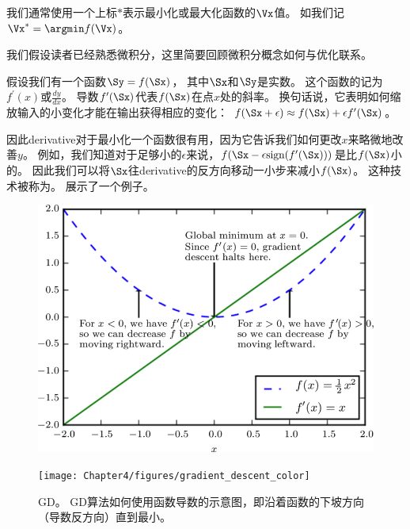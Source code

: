 我们通常使用一个上标$*$表示最小化或最大化函数的$\Vx$值。
如我们记$\Vx^*=\argmin f(\Vx)$。

我们假设读者已经熟悉微积分，这里简要回顾微积分概念如何与优化联系。


假设我们有一个函数$\Sy = f(\Sx)$， 其中$\Sx$和$\Sy$是实数。
这个函数的记为$f^\prime(x)$或$\frac{dy}{dx}$。
导数$f^\prime(\Sx)$代表$f(\Sx)$在点$x$处的斜率。
换句话说，它表明如何缩放输入的小变化才能在输出获得相应的变化：
$f(\Sx+\epsilon) \approx f(\Sx) + \epsilon f^\prime(\Sx) $。

因此\gls{derivative}对于最小化一个函数很有用，因为它告诉我们如何更改$x$来略微地改善$y$。
例如，我们知道对于足够小的$\epsilon$来说，$f(\Sx-\epsilon \text{sign}(f^\prime(\Sx)) )$是比$f(\Sx)$小的。
因此我们可以将$\Sx$往\gls{derivative}的反方向移动一小步来减小$f(\Sx)$。
这种技术被称为\citep{cauchy1847}。
展示了一个例子。
\begin{figure}[!htb]
\ifOpenSource
\centerline{\includegraphics[scale=0.5]{images/24.png}}
\else
\centerline{\texttt{[image: Chapter4/figures/gradient\_descent\_color]}}
\fi
\caption{\gls{GD}。 
\gls{GD}算法如何使用函数导数的示意图，即沿着函数的下坡方向（导数反方向）直到最小。}
\label{fig:chap4_gradient_descent_color}
\end{figure}


